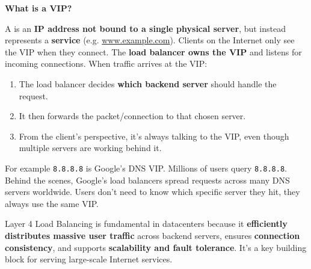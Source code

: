 \highspace
\begin{flushleft}
    \textcolor{Green3}{ \textbf{What is a VIP?}}
\end{flushleft}
A  is an \textbf{IP address not bound to a single physical server}, but instead represents a \textbf{service} (e.g. \href{http://www.example.com}{www.example.com}). Clients on the Internet only see the VIP when they connect. The \textbf{load balancer owns the VIP} and listens for incoming connections. When traffic arrives at the VIP:
\begin{enumerate}
    \item The load balancer decides \textbf{which backend server} should handle the request.
    \item It then forwards the packet/connection to that chosen server.
    \item From the client's perspective, it's always talking to the VIP, even though multiple servers are working behind it.
\end{enumerate}
For example \texttt{8.8.8.8} is Google's DNS VIP. Millions of users query \texttt{8.8.8.8}. Behind the scenes, Google's load balancers spread requests across many DNS servers worldwide. Users don't need to know which specific server they hit, they always use the same VIP.

\highspace
Layer 4 Load Balancing is fundamental in datacenters because it \textbf{efficiently distributes massive user traffic} across backend servers, ensures \textbf{connection consistency}, and supports \textbf{scalability and fault tolerance}. It's a key building block for serving large-scale Internet services.